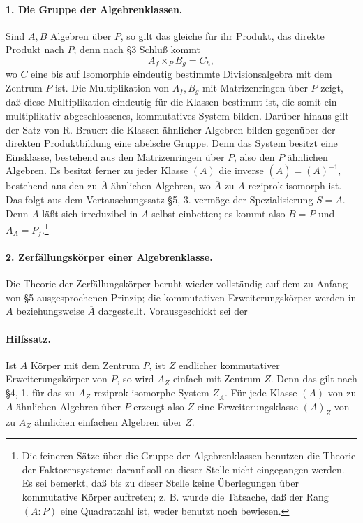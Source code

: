 \documentclass[11pt]{article}
\begin{document}
\paragraph{1. Die Gruppe der Algebrenklassen.}
Sind \(A,B\) Algebren über \(P\), so gilt das gleiche für ihr Produkt, das direkte Produkt nach \(P\); denn nach §3 Schluß kommt
\[
        A_f\times_P B_g=C_h,
\]
wo \(C\) eine bis auf Isomorphie eindeutig bestimmte Divisionsalgebra mit dem Zentrum \(P\) ist. Die Multiplikation von \(A_f,B_g\) mit Matrizenringen über \(P\) zeigt, daß diese Multiplikation eindeutig für die Klassen bestimmt ist, die somit ein multiplikativ abgeschlossenes, kommutatives System bilden. Darüber hinaus gilt der Satz von R. Brauer: die Klassen ähnlicher Algebren bilden gegenüber der direkten Produktbildung eine abelsche Gruppe. Denn das System besitzt eine Einsklasse, bestehend aus den Matrizenringen über \(P\), also den \(P\) ähnlichen Algebren. Es besitzt ferner zu jeder Klasse \((A)\) die inverse \((\overline A)=(A)^{-1}\), bestehend aus den zu \(\overline A\) ähnlichen Algebren, wo \(\overline A\) zu \(A\) reziprok isomorph ist. Das folgt aus dem Vertauschungssatz §5, 3. vermöge der Spezialisierung \(S=A\). Denn \(A\) läßt sich irreduzibel in \(A\) selbst einbetten; es kommt also \(B=P\) und \(A_A=P_f\).\footnote{Die feineren Sätze über die Gruppe der Algebrenklassen benutzen die Theorie der Faktorensysteme; darauf soll an dieser Stelle nicht eingegangen werden. Es sei bemerkt, daß bis zu dieser Stelle keine Überlegungen über kommutative Körper auftreten; z. B. wurde die Tatsache, daß der Rang \((A:P)\) eine Quadratzahl ist, weder benutzt noch bewiesen.}

\paragraph{2. Zerfällungskörper einer Algebrenklasse.}
Die Theorie der Zerfällungskörper beruht wieder vollständig auf dem zu Anfang von §5 ausgesprochenen Prinzip; die kommutativen Erweiterungskörper werden in \(A\) beziehungsweise \(\overline A\) dargestellt. Vorausgeschickt sei der

\paragraph{Hilfssatz.}
Ist \(A\) Körper mit dem Zentrum \(P\), ist \(Z\) endlicher kommutativer Erweiterungskörper von \(P\), so wird \(A_Z\) einfach mit Zentrum \(Z\). Denn das gilt nach §4, 1. für das zu \(A_Z\) reziprok isomorphe System \(Z_{\overline A}\). Für jede Klasse \((A)\) von zu \(A\) ähnlichen Algebren über \(P\) erzeugt also \(Z\) eine Erweiterungsklasse \((A)_Z\) von zu \(A_Z\) ähnlichen einfachen Algebren über \(Z\).
\end{document}

